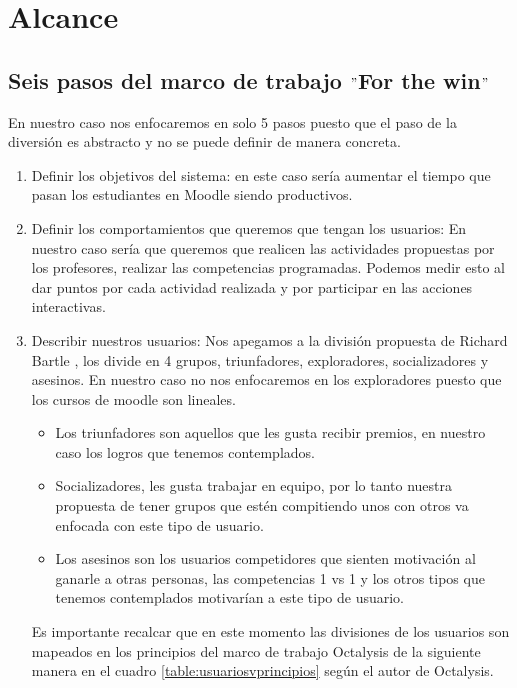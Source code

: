 
\chapter{Alcance}
\label{ch:modAlcance}

\section{Seis pasos del marco de trabajo $"$For the win$"$}

En nuestro caso nos enfocaremos en solo 5 pasos puesto que el paso de la diversión es abstracto y no se puede definir de manera concreta.

\begin{enumerate}
    \item Definir los objetivos del sistema: en este caso sería aumentar el tiempo que pasan los estudiantes en Moodle siendo productivos.
    
    \item Definir los comportamientos que queremos que tengan los usuarios: En nuestro caso sería que queremos que realicen las actividades propuestas por los profesores, realizar las competencias programadas. Podemos medir esto al dar puntos por cada actividad realizada y por participar en las acciones interactivas.
    
    \item Describir nuestros usuarios:
    Nos apegamos a la división propuesta de Richard Bartle \cite{TiposDeUsuario}, los divide en 4 grupos, triunfadores, exploradores, socializadores y asesinos. En nuestro caso no nos enfocaremos en los exploradores puesto que los cursos de moodle son lineales.
    
    \begin{itemize}
        \item Los triunfadores son aquellos que les gusta recibir premios, en nuestro caso los logros que tenemos contemplados.
        \item Socializadores, les gusta trabajar en equipo, por lo tanto nuestra propuesta de tener grupos que estén compitiendo unos con otros va enfocada con este tipo de usuario.
        \item  Los asesinos son los usuarios competidores que sienten motivación al ganarle a otras personas, las competencias 1 vs 1 y los otros tipos que tenemos contemplados motivarían a este tipo de usuario.
    \end{itemize}
    
    Es importante recalcar que en este momento las divisiones de los usuarios son mapeados en los principios del marco de trabajo Octalysis de la siguiente manera en el cuadro \ref{table:usuariosvprincipios} según el autor de Octalysis\cite[p. 414]{libro2}.
    

\end{enumerate}
